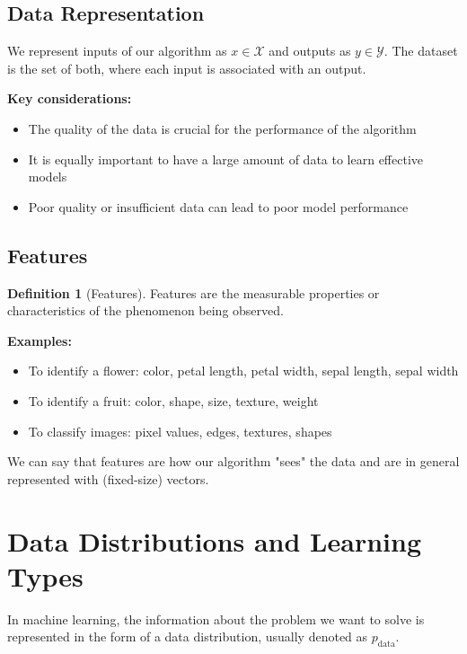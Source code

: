 \documentclass[11pt,a4paper]{article}
\theoremstyle{definition}
\newtheorem{definition}{Definition}[section]
\theoremstyle{plain}
\theoremstyle{remark}
\begin{document}
\subsection{Data Representation}

We represent inputs of our algorithm as $x \in \mathcal{X}$ and outputs as $y \in \mathcal{Y}$. The dataset is the set of both, where each input is associated with an output.

\textbf{Key considerations:}
\begin{itemize}
    \item The quality of the data is crucial for the performance of the algorithm
    \item It is equally important to have a large amount of data to learn effective models
    \item Poor quality or insufficient data can lead to poor model performance
\end{itemize}

\subsection{Features}

\begin{definition}[Features]
Features are the measurable properties or characteristics of the phenomenon being observed.
\end{definition}

\textbf{Examples:}
\begin{itemize}
    \item To identify a flower: color, petal length, petal width, sepal length, sepal width
    \item To identify a fruit: color, shape, size, texture, weight
    \item To classify images: pixel values, edges, textures, shapes
\end{itemize}

We can say that features are how our algorithm "sees" the data and are in general represented with (fixed-size) vectors.

\section{Data Distributions and Learning Types}

In machine learning, the information about the problem we want to solve is represented in the form of a data distribution, usually denoted as $p_{\text{data}}$.
\end{document}

